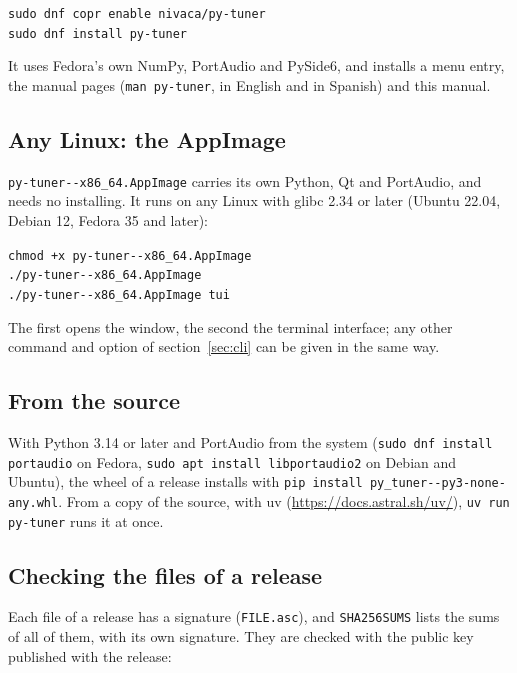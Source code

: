\documentclass[12pt,
              article,
              oneside
              ]{memoir}
\renewenvironment{quote}%
 {\begin{list}{}%
              {\setlength\rightmargin{0pt}%
              \setlength\leftmargin{\parindent}}%
  \item[]\small\ignorespaces}
 {\unskip\end{list}}
\begin{document}
\begin{quote}
\texttt{sudo dnf copr enable nivaca/py-tuner}\\
\texttt{sudo dnf install py-tuner}
\end{quote}

\noindent It uses Fedora's own NumPy, PortAudio and PySide6, and installs
a menu entry, the manual pages (\texttt{man py-tuner}, in English and in
Spanish) and this manual.

\subsection{Any Linux: the AppImage}

%
\texttt{py-tuner-\version-x86\_64.AppImage} carries its own Python, Qt and
PortAudio, and needs no installing. It runs on any Linux with glibc 2.34
or later (Ubuntu 22.04, Debian 12, Fedora 35 and later):

\begin{quote}
\texttt{chmod +x py-tuner-\version-x86\_64.AppImage}\\
\texttt{./py-tuner-\version-x86\_64.AppImage}\\
\texttt{./py-tuner-\version-x86\_64.AppImage tui}
\end{quote}

\noindent The first opens the window, the second the terminal interface;
any other command and option of section~\ref{sec:cli} can be given in the
same way.

\subsection{From the source}

%
With Python 3.14 or later and PortAudio from the system (\texttt{sudo dnf
install portaudio} on Fedora, \texttt{sudo apt install libportaudio2} on
Debian and Ubuntu), the wheel of a release installs with \texttt{pip
install py\_tuner-\version-py3-none-any.whl}. From a copy of the source,
with uv (\url{https://docs.astral.sh/uv/}), \texttt{uv run py-tuner} runs
it at once.

\subsection{Checking the files of a release}
\label{sec:signatures}

%
Each file of a release has a signature (\texttt{FILE.asc}), and
\texttt{SHA256SUMS} lists the sums of all of them, with its own signature.
They are checked with the public key published with the release:
\end{document}
